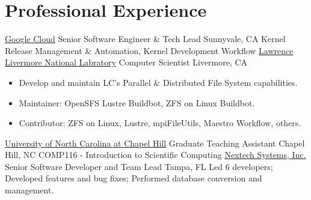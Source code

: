 \section{Professional Experience}
		{\href{http://www.google.com}{Google Cloud}}
		{Senior Software Engineer \& Tech Lead}
		{Sunnyvale, CA}{}
		{Kernel Release Management \& Automation, Kernel Development Workflow}
		{\href{http://www.llnl.gov}{Lawrence Livermore National Labratory}}
		{Computer Scientist}
		{Livermore, CA}{}
		{\begin{itemize}
		\item Develop and maintain LC's Parallel \& Distributed File System capabilities.
		\item Maintainer: OpenSFS Lustre Buildbot, ZFS on Linux Buildbot.
		\item Contributor: ZFS on Linux, Lustre, mpiFileUtils, Maestro Workflow, others.
		\end{itemize}}
		{\href{http://www.unc.edu}{University of North Carolina at Chapel Hill}}
		{Graduate Teaching Assistant}
		{Chapel Hill, NC}{}
		{COMP116 - Introduction to Scientific Computing}
		{\href{http://www.nextech.com}{Nextech Systems, Inc.}}
		{Senior Software Developer and Team Lead}
		{Tampa, FL}{}
		{Led 6 developers; Developed features and
		bug fixes; Performed database conversion and management.}

